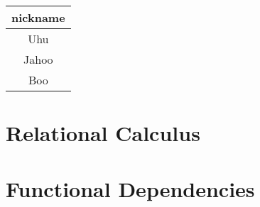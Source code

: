 \subsection{~}

\begin{tabular}{| c |}
\hline 
\textbf{nickname}\\
\hline
Uhu\\
\hline
Jahoo\\
\hline 
Boo\\
\hline
\end{tabular}

\section{Relational Calculus}

\section{Functional Dependencies}
